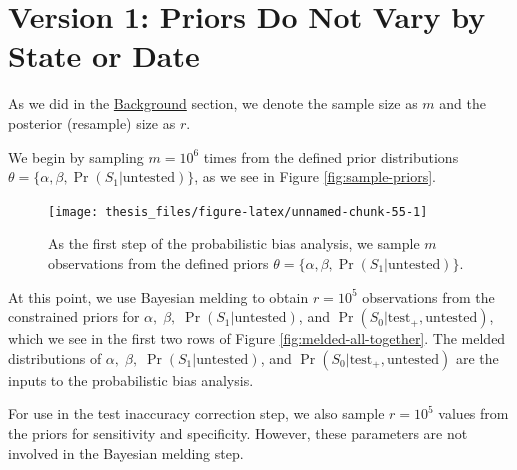 \documentclass[12pt,twoside]{smiththesis}
\begin{document}
\newpage

\hypertarget{version-1-priors-do-not-vary-by-state-or-date}{%
\section{Version 1: Priors Do Not Vary by State or Date}\label{version-1-priors-do-not-vary-by-state-or-date}}

As we did in the \protect\hyperlink{sampling}{Background} section, we denote the sample size as \(m\) and the posterior (resample) size as \(r\).

We begin by sampling \(m=10^6\) times from the defined prior distributions \(\theta = \Big\{ \alpha, \beta, \Pr(S_1| \text{untested})\Big\}\), as we see in Figure \ref{fig:sample-priors}.
\begin{figure}
\texttt{[image: thesis\_files/figure-latex/unnamed-chunk-55-1]} \caption{\label{fig:sample-priors}As the first step of the probabilistic bias analysis, we sample $m$ observations from the defined priors  $\theta = \{ \alpha, \beta, \Pr(S_1| \text{untested})\}$.}\label{fig:unnamed-chunk-55}
\end{figure}
At this point, we use Bayesian melding to obtain \(r=10^5\) observations from the constrained priors for \(\alpha, \; \beta, \;\Pr(S_1|\text{untested})\), and \(\Pr(S_0|\text{test}_+,\text{untested})\), which we see in the first two rows of Figure \ref{fig:melded-all-together}. The melded distributions of \(\alpha, \; \beta, \;\Pr(S_1|\text{untested})\), and \(\Pr(S_0|\text{test}_+,\text{untested})\) are the inputs to the probabilistic bias analysis.

For use in the test inaccuracy correction step, we also sample \(r=10^5\) values from the priors for sensitivity and specificity. However, these parameters are not involved in the Bayesian melding step.

~

~

~

~

~

~

~

~

~

~
\end{document}
